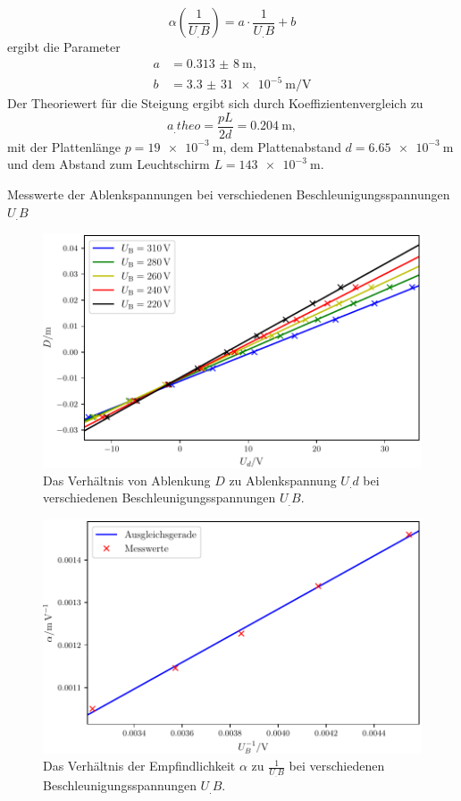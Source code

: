 \[\alpha\left(\frac{1}{U_.B}\right)=a\cdot\frac{1}{U_.B}+b\]
ergibt die Parameter
\begin{align*}
a&=\SI{0,313(8)}{\metre},\\
b&=\SI{3,3(31)e-5}{\metre\per\volt}
\end{align*}
Der Theoriewert für die Steigung ergibt sich durch Koeffizientenvergleich zu
\[
a_.{theo}=\frac{pL}{2d}=\SI{0,204}{\metre},
\]
mit der Plattenlänge $p=\SI{19e-3}{\metre}$, dem Plattenabstand $d=\SI{6,65e-3}{\metre}$ und dem Abstand zum Leuchtschirm $L=\SI{143e-3}{\metre}$\cite{V501}.
\begin{table}
\centering
\caption{Messwerte der Ablenkspannungen bei verschiedenen Beschleunigungsspannungen $U_.B$}

\label{tab:Elek}
\end{table}
\begin{figure}
\centering
\includegraphics[width=\linewidth-70pt,height=\textheight-70pt,keepaspectratio]{content/images/GraphEle.pdf}
\caption{Das Verhältnis von Ablenkung $D$ zu Ablenkspannung $U_.d$ bei verschiedenen Beschleunigungsspannungen $U_.B$.}\label{fig:Elek}
\end{figure}
\begin{figure}
\centering
\includegraphics[width=\linewidth-70pt,height=\textheight-70pt,keepaspectratio]{content/images/GraphEle6.pdf}
\caption{Das Verhältnis der Empfindlichkeit $\alpha$ zu $\frac{1}{U_.B}$ bei verschiedenen Beschleunigungsspannungen $U_.B$.}\label{fig:Elek2}
\end{figure}

